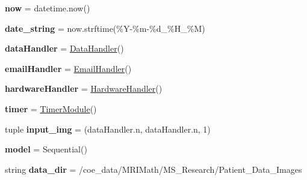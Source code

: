 \begin{DoxyCompactItemize}
\item 
\mbox{\label{namespaceTrainModels_a7b50d538df86ccd751bf581df2807d53}} 
{\bfseries now} = datetime.\+now()
\item 
\mbox{\label{namespaceTrainModels_a07b3abd382a830f18c2173044d8c2359}} 
{\bfseries date\+\_\+string} = now.\+strftime(\textquotesingle{}\%Y-\/\%m-\/\%d\+\_\+\%H\+\_\+\%M\textquotesingle{})
\item 
\mbox{\label{namespaceTrainModels_aee65351eea3aa49094cfd8b2830698a2}} 
{\bfseries data\+Handler} = \mbox{\hyperlink{classDataHandler_1_1DataHandler}{Data\+Handler}}()
\item 
\mbox{\label{namespaceTrainModels_a9a320c094658642e556dd99cda67c14b}} 
{\bfseries email\+Handler} = \mbox{\hyperlink{classEmailHandler_1_1EmailHandler}{Email\+Handler}}()
\item 
\mbox{\label{namespaceTrainModels_acda508ee651a24dc494b8b5d6b122a07}} 
{\bfseries hardware\+Handler} = \mbox{\hyperlink{classHardwareHandler_1_1HardwareHandler}{Hardware\+Handler}}()
\item 
\mbox{\label{namespaceTrainModels_a402cebc5f650b03cb0a34571814b0531}} 
{\bfseries timer} = \mbox{\hyperlink{classTimerModule_1_1TimerModule}{Timer\+Module}}()
\item 
\mbox{\label{namespaceTrainModels_a89fd756f1c13c4f91aff4c2d7228c921}} 
tuple {\bfseries input\+\_\+img} = (data\+Handler.\+n, data\+Handler.\+n, 1)
\item 
\mbox{\label{namespaceTrainModels_a1b636609ffc1e292387e3e1342035aaa}} 
{\bfseries model} = Sequential()
\item 
\mbox{\label{namespaceTrainModels_a1502ab8e1ca8878dcab1e8d146ba6b44}} 
string {\bfseries data\+\_\+dir} = \textquotesingle{}/coe\+\_\+data/M\+R\+I\+Math/M\+S\+\_\+\+Research/Patient\+\_\+\+Data\+\_\+\+Images\textquotesingle{}
\item 

\end{DoxyCompactItemize}
